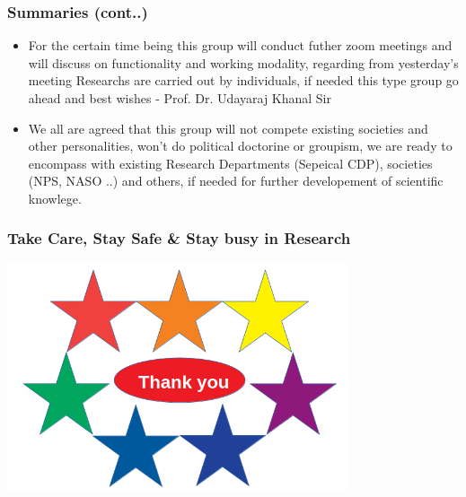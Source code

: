 \documentclass{beamer}
\begin{document}
\begin{frame}
\frametitle{\bf Summaries (cont..) }
\begin{itemize} 
	\bf 
	
	\item \color{blue}  For the certain time being this group will conduct futher zoom meetings and will discuss on functionality and working modality, regarding from yesterday's meeting
	Researchs are carried out by individuals, if needed this type group go ahead and best wishes - Prof. Dr. Udayaraj Khanal Sir
	
	\item \color{red}  We all are agreed that this group will not compete existing societies and other personalities, won't do political doctorine or groupism, we are ready to encompass with existing Research Departments (Sepeical CDP), societies (NPS, NASO ..) and others, if needed for further developement of scientific knowlege. 
\end{itemize}

\end{frame}
\begin{frame}
\frametitle{\bf Take Care, Stay Safe \& Stay busy in Research}
\centering
\includegraphics[width=10cm]{Thn}
\end{frame}	
	
\end{document}

